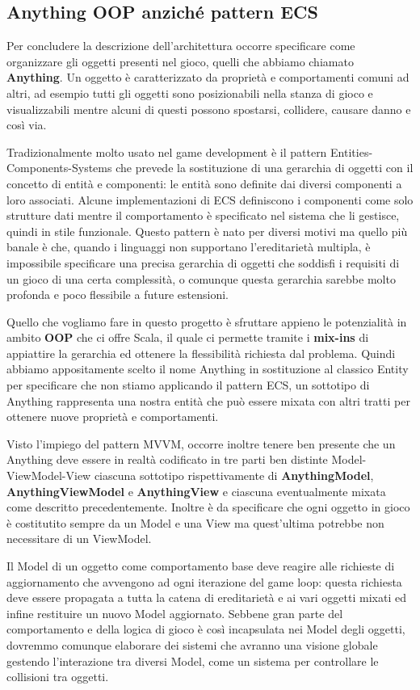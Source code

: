 \subsection{Anything OOP anziché pattern ECS}
Per concludere la descrizione dell'architettura occorre specificare come organizzare gli oggetti presenti nel gioco, quelli che abbiamo chiamato \textbf{Anything}.
Un oggetto è caratterizzato da proprietà e comportamenti comuni ad altri, ad esempio tutti gli oggetti sono posizionabili nella stanza di gioco e visualizzabili mentre alcuni di questi possono spostarsi, collidere, causare danno e così via.

Tradizionalmente molto usato nel game development è il pattern Entities-Components-Systems che prevede la sostituzione di una gerarchia di oggetti con il concetto di entità e componenti: le entità sono definite dai diversi componenti a loro associati. 
Alcune implementazioni di ECS definiscono i componenti come solo strutture dati mentre il comportamento è specificato nel sistema che li gestisce, quindi in stile funzionale. 
Questo pattern è nato per diversi motivi ma quello più banale è che, quando i linguaggi non supportano l'ereditarietà multipla, è impossibile specificare una precisa gerarchia di oggetti che soddisfi i requisiti di un gioco di una certa complessità, o comunque questa gerarchia sarebbe molto profonda e poco flessibile a future estensioni.

Quello che vogliamo fare in questo progetto è sfruttare appieno le potenzialità in ambito \textbf{OOP} che ci offre Scala, il quale ci permette tramite i \textbf{mix-ins} di appiattire la gerarchia ed ottenere la flessibilità richiesta dal problema.
Quindi abbiamo appositamente scelto il nome Anything in sostituzione al classico Entity per specificare che non stiamo applicando il pattern ECS, un sottotipo di Anything rappresenta una nostra entità che può essere mixata con altri tratti per ottenere nuove proprietà e comportamenti. 

Visto l'impiego del pattern MVVM, occorre inoltre tenere ben presente che un Anything deve essere in realtà codificato in tre parti ben distinte Model-ViewModel-View ciascuna sottotipo rispettivamente di \textbf{AnythingModel}, \textbf{AnythingViewModel} e \textbf{AnythingView} e ciascuna eventualmente mixata come descritto precedentemente. 
Inoltre è da specificare che ogni oggetto in gioco è costitutito sempre da un Model e una View ma quest'ultima potrebbe non necessitare di un ViewModel.

Il Model di un oggetto come comportamento base deve reagire alle richieste di aggiornamento che avvengono ad ogni iterazione del game loop: questa richiesta deve essere propagata a tutta la catena di ereditarietà e ai vari oggetti mixati ed infine restituire un nuovo Model aggiornato.
Sebbene gran parte del comportamento e della logica di gioco è così incapsulata nei Model degli oggetti, dovremmo comunque elaborare dei sistemi che avranno una visione globale gestendo l'interazione tra diversi Model, come un sistema per controllare le collisioni tra oggetti.

